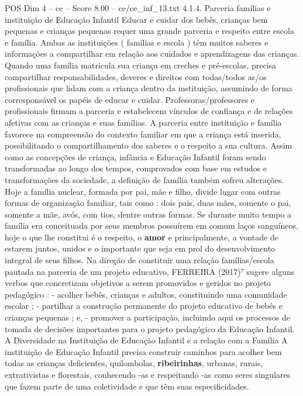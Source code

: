 \begin{textsample}{POS Dim 4 – ce – Score 8.00 – ce/ce\_inf\_13.txt}  \label{ex:f4_pos_140}
4.1.4.
Parceria famílias e instituição de Educação Infantil Educar e cuidar dos bebês, crianças bem pequenas e crianças pequenas requer uma grande parceria e respeito entre escola e família.
Ambas as instituições ( famílias e escola ) têm muitos saberes e informações a compartilhar em relação aos cuidados e aprendizagens das crianças.
Quando uma família matricula sua criança em creches e pré-escolas, precisa compartilhar responsabilidades, deveres e direitos com todas/todos as/os profissionais que lidam com a criança dentro da instituição, assumindo de forma corresponsável os papéis de educar e cuidar.
Professoras/professores e profissionais firmam a parceria e estabelecem vínculos de confiança e de relações afetivas com as crianças e suas famílias.
A parceria entre instituição e família favorece na compreensão do contexto familiar em que a criança está inserida, possibilitando o compartilhamento dos saberes e o respeito a sua cultura.
Assim como as concepções de criança, infância e Educação Infantil foram sendo transformadas ao longo dos tempos, comprovados com base em estudos e transformações da sociedade, a definição de família também sofreu alterações.
Hoje a família nuclear, formada por pai, mãe e filho, divide lugar com outras formas de organização familiar, tais como : dois pais, duas mães, somente o pai, somente a mãe, avós, com tios, dentre outras formas.
Se durante muito tempo a família era conceituada por seus membros possuírem em comum laços sanguíneos, hoje o que lhe constitui é o respeito, o \textbf{amor} e principalmente, a vontade de estarem juntos, unidos e o importante que seja em prol do desenvolvimento integral de seus filhos.
Na direção de constituir uma relação famílias/escola pautada na parceria de um projeto educativo, FERREIRA (2017)⁷ sugere alguns verbos que concretizam objetivos a serem promovidos e geridos no projeto pedagógico : - acolher bebês, crianças e adultos, constituindo uma comunidade escolar ; - partilhar a construção permanente do projeto educativo de bebês e crianças pequenas ; e, - promover a participação, incluindo aqui os processos de tomada de decisões importantes para o projeto pedagógico da Educação Infantil.
A Diversidade na Instituição de Educação Infantil e a relação com a Família A instituição de Educação Infantil precisa construir caminhos para acolher bem todas as crianças deficientes, quilombolas, \textbf{ribeirinhas}, urbanas, rurais, extrativistas e florestais, conhecendo -as e respeitando -as como seres singulares que fazem parte de uma coletividade e que têm suas especificidades.

\end{textsample}
